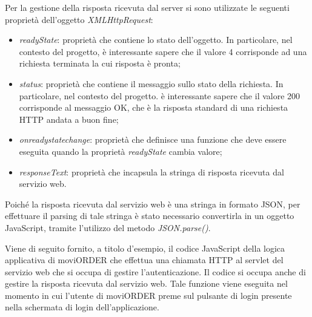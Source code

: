Per la gestione della risposta ricevuta dal server si sono utilizzate le seguenti proprietà dell'oggetto \textit{XMLHttpRequest}:
\begin{itemize}
	\item \textit{readyState}: proprietà che contiene lo stato dell'oggetto. In particolare, nel contesto del progetto, è interessante sapere che il valore 4 corrisponde ad una richiesta terminata la cui risposta è pronta;
	\item  \textit{status}: proprietà che contiene il messaggio sullo stato della richiesta. In particolare, nel contesto del progetto. è interessante sapere che il valore 200 corrisponde al messaggio OK, che è la risposta standard di una richiesta HTTP andata a buon fine;
	\item \textit{onreadystatechange}: proprietà che definisce una funzione che deve essere eseguita quando la proprietà \textit{readyState} cambia valore;
	\item \textit{responseText}: proprietà che incapsula la stringa di risposta ricevuta dal servizio web. 
\end{itemize} 
Poiché la risposta ricevuta dal servizio web è una stringa in formato JSON, per effettuare il parsing di tale stringa è stato necessario convertirla in un oggetto JavaScript, tramite l'utilizzo del metodo \textit{JSON.parse()}.

Viene di seguito fornito, a titolo d'esempio, il codice JavaScript della logica applicativa di moviORDER che effettua una chiamata HTTP al servlet del servizio web che si occupa di gestire l'autenticazione. Il codice si occupa anche di gestire la risposta ricevuta dal servizio web. Tale funzione viene eseguita nel momento in cui l'utente di moviORDER preme sul pulsante di login presente nella schermata di login dell'applicazione.

\newpage

